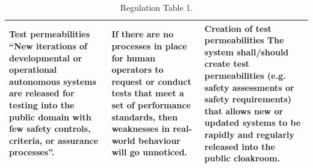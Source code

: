 \documentclass[lettersize,journal]{IEEEtran}
\begin{document}
\begin{landscape}
\begin{table}[]
\begin{tabular}{|p{0.3\textheight}|p{0.35\textheight}|p{0.35\textheight}|}
\hline
\textbf{Test permeabilities}
``New iterations of developmental or operational autonomous systems are released for testing into the public domain with few safety controls, criteria, or assurance processes”. \cite{macrae2021learning} & If there are no processes in place for human operators to request or conduct tests that meet a set of performance standards, then weaknesses in real-world behaviour will go unnoticed. & \textbf{Creation of test permeabilities} The system shall/should create test permeabilities (e.g. safety assessments or safety requirements) that allows new or updated systems to be rapidly and regularly released into the public cloakroom. \\
\hline
    \end{tabular}
    \caption{Regulation Table 1.}
    \label{tab:reg_1}
\end{table}
\end{landscape}
\end{document}
